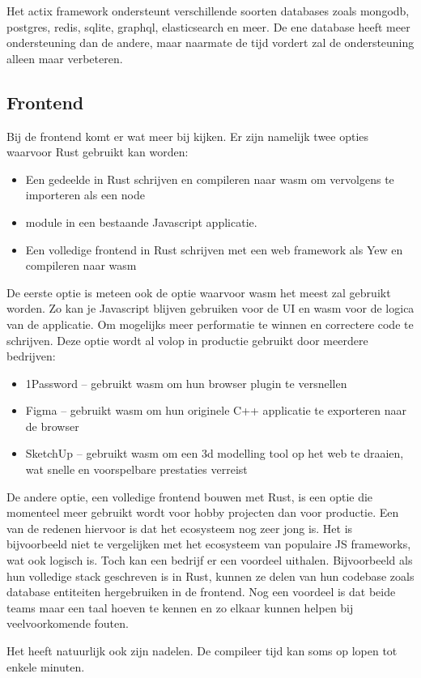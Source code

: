 Het actix framework ondersteunt verschillende soorten databases zoals mongodb, postgres, redis,
sqlite, graphql, elasticsearch en meer. De ene database heeft meer ondersteuning dan de andere, maar
naarmate de tijd vordert zal de ondersteuning alleen maar verbeteren. 

\subsection{Frontend}

Bij de frontend komt er wat meer bij kijken. Er zijn namelijk twee opties waarvoor Rust gebruikt kan
worden: 
\begin{itemize}
  \item Een gedeelde in Rust schrijven en compileren naar wasm om vervolgens te importeren als een node
  \item module in een bestaande Javascript applicatie. 
  \item Een volledige frontend in Rust schrijven met een web framework als Yew en compileren naar wasm 
\end{itemize}               

\clearpage

De eerste optie is meteen ook de optie waarvoor wasm het meest zal gebruikt worden. Zo kan je
Javascript blijven gebruiken voor de UI en wasm voor de logica van de applicatie. Om mogelijks meer
performatie te winnen en correctere code te schrijven. Deze optie wordt al volop in productie
gebruikt door meerdere bedrijven: 
\begin{itemize}
  \item 1Password – gebruikt wasm om hun browser plugin te versnellen 
  \item Figma – gebruikt wasm om hun originele C++ applicatie te exporteren naar de browser 
  \item SketchUp – gebruikt wasm om een 3d modelling tool op het web te draaien, wat snelle en
    voorspelbare prestaties verreist 
\end{itemize}

De andere optie, een volledige frontend bouwen met Rust, is een optie die momenteel meer gebruikt
wordt voor hobby projecten dan voor productie. Een van de redenen hiervoor is dat het ecosysteem nog
zeer jong is. Het is bijvoorbeeld niet te vergelijken met het ecosysteem van populaire JS
frameworks, wat ook logisch is. Toch kan een bedrijf er een voordeel uithalen. Bijvoorbeeld als hun
volledige stack geschreven is in Rust, kunnen ze delen van hun codebase zoals database entiteiten
hergebruiken in de frontend. Nog een voordeel is dat beide teams maar een taal hoeven te kennen en
zo elkaar kunnen helpen bij veelvoorkomende fouten.  

Het heeft natuurlijk ook zijn nadelen. De compileer tijd kan soms op lopen tot enkele minuten. 

\blindtext

